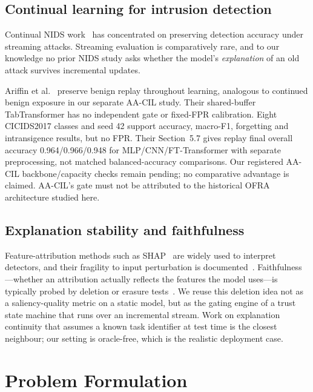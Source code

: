 \documentclass[conference]{IEEEtran}
\begin{document}
\subsection{Continual learning for intrusion detection}
Continual NIDS work~\cite{amalapuram2022augmented,zhang2024ssf,islam2026maids}
has concentrated on preserving detection accuracy under streaming attacks.
Streaming evaluation is comparatively rare, and to our knowledge no prior NIDS
study asks whether the model's \emph{explanation} of an old attack survives
incremental updates.

Ariffin et al.~\cite{ariffin2026replayids} preserve benign replay throughout learning, analogous to continued benign exposure in our separate AA-CIL study. Their shared-buffer TabTransformer has no independent gate or fixed-FPR calibration. Eight CICIDS2017 classes and seed 42 support accuracy, macro-F1, forgetting and intransigence results, but no FPR. Their Section~5.7 gives replay final overall accuracy 0.964/0.966/0.948 for MLP/CNN/FT-Transformer with separate preprocessing, not matched balanced-accuracy comparisons. Our registered AA-CIL backbone/capacity checks remain pending; no comparative advantage is claimed. AA-CIL's gate must not be attributed to the historical OFRA architecture studied here.

\subsection{Explanation stability and faithfulness}
Feature-attribution methods such as SHAP~\cite{lundberg2017unified} are widely
used to interpret detectors, and their fragility to input perturbation is
documented~\cite{ghorbani2019interpretation}. Faithfulness---whether an
attribution actually reflects the features the model uses---is typically probed
by deletion or erasure tests~\cite{petsiuk2018rise,deyoung2020eraser}. We reuse
this deletion idea not as a saliency-quality metric on a static model, but as the
gating engine of a trust state machine that runs over an incremental stream. Work
on explanation continuity that assumes a known task identifier at test time is
the closest neighbour; our setting is oracle-free, which is the realistic
deployment case.

\section{Problem Formulation}
\label{sec:problem}
\end{document}
